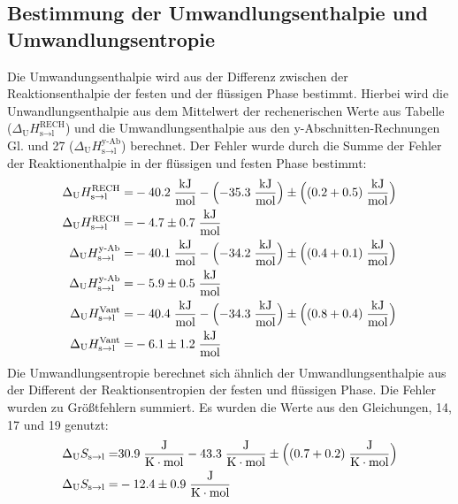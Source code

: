 \documentclass[12pt,a4paper,titlepage,headinclude,bibtotoc]{scrartcl}
\begin{document}
\subsection{Bestimmung der Umwandlungsenthalpie und Umwandlungsentropie}
Die Umwandungsenthalpie wird aus der Differenz zwischen der Reaktionsenthalpie der festen und der flüssigen Phase bestimmt. Hierbei wird die Unwandlungsenthalpie aus dem Mittelwert der rechenerischen Werte aus Tabelle ($\Delta_\text{U} H_{\text{s}\rightarrow\text{l}}^{\text{RECH}}$) und die Umwandlungsenthalpie aus den y-Abschnitten-Rechnungen Gl. und 27 ($\Delta_\text{U} H_{\text{s}\rightarrow\text{l}}^{\text{y-Ab}}$) berechnet. Der Fehler wurde durch die Summe der Fehler der Reaktionenthalpie in der flüssigen und festen Phase bestimmt:
\begin{align}
\Delta_\text{U} H_{\text{s}\rightarrow\text{l}}^{\text{RECH}}=&  -40.2\;\frac{\text{kJ}}{\text{mol}} - \Bigl(-35.3\;\frac{\text{kJ}}{\text{mol}}\Bigr) \pm \Bigl((0.2+0.5)\;\frac{\text{kJ}}{\text{mol}}\Bigr)\\
\Delta_\text{U} H_{\text{s}\rightarrow\text{l}}^{\text{RECH}}=& -4.7\pm 0.7 \;\frac{\text{kJ}}{\text{mol}}\\
\Delta_\text{U} H_{\text{s}\rightarrow\text{l}}^{\text{y-Ab}}=&  -40.1\;\frac{\text{kJ}}{\text{mol}} - \Bigl(-34.2\;\frac{\text{kJ}}{\text{mol}}\Bigr) \pm \Bigl((0.4+0.1)\;\frac{\text{kJ}}{\text{mol}}\Bigr)\\
\Delta_\text{U} H_{\text{s}\rightarrow\text{l}}^{\text{y-Ab}}=& -5.9 \pm 0.5 \;\frac{\text{kJ}}{\text{mol}}\\
\Delta_\text{U} H_{\text{s}\rightarrow\text{l}}^{\text{Vant}}=&  -40.4\;\frac{\text{kJ}}{\text{mol}} - \Bigl(-34.3\;\frac{\text{kJ}}{\text{mol}}\Bigr) \pm \Bigl((0.8+0.4)\;\frac{\text{kJ}}{\text{mol}}\Bigr)\\
\Delta_\text{U} H_{\text{s}\rightarrow\text{l}}^{\text{Vant}}=& -6.1 \pm 1.2 \;\frac{\text{kJ}}{\text{mol}}
\end{align}
Die Umwandlungsentropie berechnet sich ähnlich der Umwandlungsenthalpie aus der Different der Reaktionsentropien der festen und flüssigen Phase. Die Fehler wurden zu Größtfehlern summiert. Es wurden die Werte aus den Gleichungen, 14, 17 und 19 genutzt:
\begin{align}
\Delta_\text{U} S_{\text{s}\rightarrow\text{l}}=&  30.9\;\frac{\text{J}}{\text{K}\cdot\text{mol}} - 43.3\;\frac{\text{J}}{\text{K}\cdot\text{mol}} \pm \Bigl((0.7+0.2)\;\frac{\text{J}}{\text{K}\cdot\text{mol}}\Bigr)\\
\Delta_\text{U} S_{\text{s}\rightarrow\text{l}}=& -12.4\pm0.9 \;\frac{\text{J}}{\text{K}\cdot\text{mol}}
\end{align}
\end{document}
